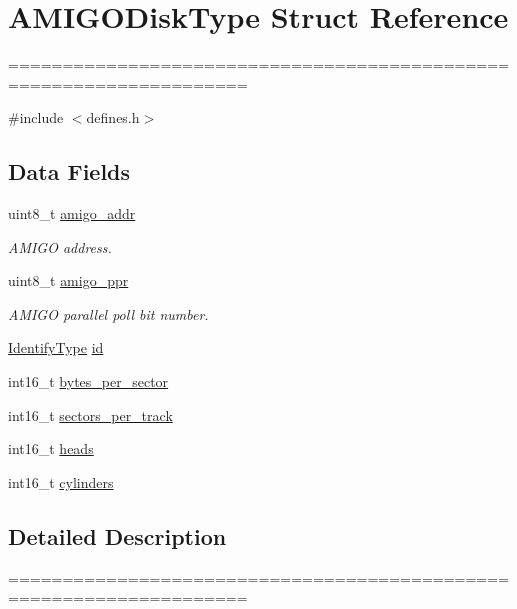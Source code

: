 \hypertarget{structAMIGODiskType}{}\section{A\+M\+I\+G\+O\+Disk\+Type Struct Reference}
\label{structAMIGODiskType}


====================================================================  




{\ttfamily \#include $<$defines.\+h$>$}

\subsection*{Data Fields}
\begin{DoxyCompactItemize}
\item 
uint8\+\_\+t \hyperlink{structAMIGODiskType_a83024d746078dbf1b35e63fa38b9185c}{amigo\+\_\+addr}
\begin{DoxyCompactList}\small\item\em A\+M\+I\+GO address. \end{DoxyCompactList}\item 
uint8\+\_\+t \hyperlink{structAMIGODiskType_abf1e4513e84f8f4598577e20151f1e2d}{amigo\+\_\+ppr}
\begin{DoxyCompactList}\small\item\em A\+M\+I\+GO parallel poll bit number. \end{DoxyCompactList}\item 
\hyperlink{structIdentifyType}{Identify\+Type} \hyperlink{structAMIGODiskType_a184bee0e5c2958f174c972130c241cbe}{id}
\item 
int16\+\_\+t \hyperlink{structAMIGODiskType_aaba90c38cd54cffcffefd43955f137c2}{bytes\+\_\+per\+\_\+sector}
\item 
int16\+\_\+t \hyperlink{structAMIGODiskType_a110284612bb89198e8c9fe31c8dabcba}{sectors\+\_\+per\+\_\+track}
\item 
int16\+\_\+t \hyperlink{structAMIGODiskType_ac24acfa9854cf9333d7aace761a739be}{heads}
\item 
int16\+\_\+t \hyperlink{structAMIGODiskType_ae89d76a3143c33f3d61b0465ac2e8fe3}{cylinders}
\end{DoxyCompactItemize}


\subsection{Detailed Description}
==================================================================== 

